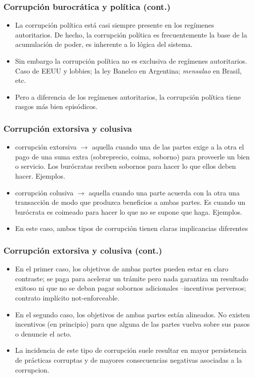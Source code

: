 \documentclass[handout,final,xcolor=dvipsnames]{beamer}
\begin{document}
\begin{frame}\frametitle{Corrupción burocrática y política (cont.)}
\begin{itemize}\itemsep 10pt
\item La corrupción política está casi siempre presente en los
  regímenes autoritarios. De hecho, la corrupción política es
  frecuentemente la base de la acumulación de poder, es inherente a lo
  lógica del sistema. 
\item Sin embargo la corrupción política no es
  exclusiva de regímenes autoritarios. Caso de EEUU y lobbies; la ley
  Banelco en Argentina; \textit{mensalao} en Brasil, etc. 
\item Pero a diferencia de los regímenes autoritarios, la corrupción
  política tiene rasgos más bien episódicos. 
\end{itemize}
\end{frame}



\begin{frame}\frametitle{Corrupción extorsiva y colusiva}
\begin{itemize}\itemsep 10pt
\item corrupción extorsiva $\longrightarrow$ aquella cuando una de las partes exige a la otra el pago
de una suma extra (sobreprecio, coima, soborno) para proveerle un bien
o servicio. Los burócratas reciben sobornos para hacer lo que ellos deben
  hacer. Ejemplos.
\item corrupción colusiva $\longrightarrow$ aquella cuando una parte
  acuerda con la otra una transacción de modo que produzca beneficios
  a ambas partes. Es cuando un burócrata es coimeado para hacer lo que
  no se supone que haga. Ejemplos. 
\item En este caso, ambos tipos de corrupción tienen claras
  implicancias diferentes
\end{itemize}
\end{frame}



\begin{frame}\frametitle{Corrupción extorsiva y colusiva (cont.)}
\begin{itemize}\itemsep 10pt
\item En el primer caso, los objetivos de ambas partes pueden estar en claro
  contraste; se paga para acelerar un trámite pero nada garantiza un
  resultado exitoso ni que no se deban pagar sobornos adicionales
  --incentivos perversos; contrato implícito not-enforceable.
\item En el segundo caso, los objetivos de ambas partes están
  alineados. No existen incentivos (en principio) para que alguna de
  las partes vuelva sobre sus pasos o denuncie el acto. 
\item La incidencia de este tipo de corrupción suele resultar en mayor
  persistencia de prácticas corruptas y de mayores consecuencias
  negativas asociadas a la corrupcion. 
\end{itemize}
\end{frame}
\end{document}
